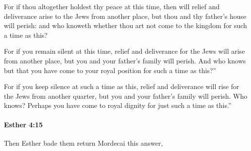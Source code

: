 			\begin{versebox}
					\item[BHS] 
					\item[LXX] 
					\item[ASV] For if thou altogether holdest thy peace at this time, then will relief and deliverance arise to the Jews from another place, but thou and thy father's house will perish: and who knoweth whether thou art not come to the kingdom for such a time as this?
					\item[NIV] For if you remain silent at this time, relief and deliverance for the Jews will arise from another place, but you and your father’s family will perish. And who knows but that you have come to your royal position for such a time as this?”
					\item[NRSV] For if you keep silence at such a time as this, relief and deliverance will rise for the Jews from another quarter, but you and your father’s family will perish. Who knows? Perhaps you have come to royal dignity for just such a time as this.”
			\end{versebox}

		\paragraph{Esther 4:15} %
			\label{ESTHER-4-15}

			Then Esther bade them return Mordecai this answer,

